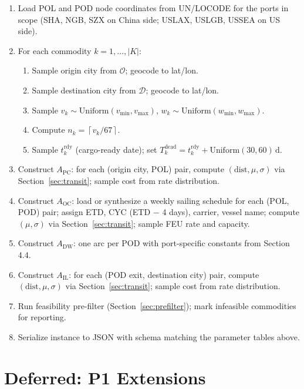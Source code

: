 \documentclass[11pt,a4paper]{article}
\newcommand{\ceil}[1]{\left\lceil #1 \right\rceil}
\theoremstyle{definition}
\begin{document}
\begin{enumerate}
  \item Load POL and POD node coordinates from UN/LOCODE for the ports in scope
        (SHA, NGB, SZX on China side; USLAX, USLGB, USSEA on US side).
  \item For each commodity $k = 1, \ldots, |K|$:
    \begin{enumerate}
      \item Sample origin city from $\mathcal{O}$; geocode to lat/lon.
      \item Sample destination city from $\mathcal{D}$; geocode to lat/lon.
      \item Sample $v_k \sim \text{Uniform}(v_{\min}, v_{\max})$,
            $w_k \sim \text{Uniform}(w_{\min}, w_{\max})$.
      \item Compute $n_k = \ceil{v_k / 67}$.
      \item Sample $t_k^{\text{rdy}}$ (cargo-ready date); set $T_k^{\text{dead}} = t_k^{\text{rdy}} + \text{Uniform}(30, 60)\,\text{d}$.
    \end{enumerate}
  \item Construct $A_{\text{PC}}$: for each (origin city, POL) pair, compute
        $(\text{dist}, \mu, \sigma)$ via Section~\ref{sec:transit}; sample cost
        from rate distribution.
  \item Construct $A_{\text{OC}}$: load or synthesize a weekly sailing schedule for
        each (POL, POD) pair; assign ETD, CYC (ETD $-$ 4 days), carrier, vessel name;
        compute $(\mu, \sigma)$ via Section~\ref{sec:transit}; sample FEU rate and
        capacity.
  \item Construct $A_{\text{DW}}$: one arc per POD with port-specific constants from
        Section 4.4.
  \item Construct $A_{\text{IL}}$: for each (POD exit, destination city) pair, compute
        $(\text{dist}, \mu, \sigma)$ via Section~\ref{sec:transit}; sample cost from
        rate distribution.
  \item Run feasibility pre-filter (Section~\ref{sec:prefilter}); mark infeasible
        commodities for reporting.
  \item Serialize instance to JSON with schema matching the parameter tables above.
\end{enumerate}

\section{Deferred: P1 Extensions}
\label{sec:deferred}
\end{document}
